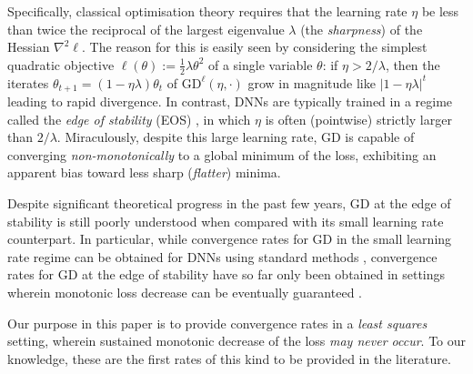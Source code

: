 \documentclass{article}
\newcommand{\GD}{\mathrm{GD}}
\theoremstyle{plain}
\theoremstyle{definition}
\theoremstyle{remark}
\begin{document}
Specifically, classical optimisation theory requires that the learning rate $\eta$ be less than twice the reciprocal of the largest eigenvalue $\lambda$ (the \emph{sharpness}) of the Hessian $\nabla^2\ell$. The reason for this is easily seen by considering the simplest quadratic objective $\ell(\theta):=\frac{1}{2}\lambda\theta^2$ of a single variable $\theta$: if $\eta>2/\lambda$, then the iterates $\theta_{t+1} = (1-\eta\lambda)\theta_t$ of $\GD^{\ell}(\eta,\cdot)$ grow in magnitude like $|1-\eta\lambda|^t$ leading to rapid divergence. In contrast, DNNs are typically trained in a regime called the \emph{edge of stability} (EOS) \cite{coheneos}, in which $\eta$ is often (pointwise) strictly larger than $2/\lambda$. Miraculously, despite this large learning rate, GD is capable of converging \emph{non-monotonically} to a global minimum of the loss, exhibiting an apparent bias toward less sharp (\emph{flatter}) minima.

Despite significant theoretical progress in the past few years, GD at the edge of stability is still poorly understood when compared with its small learning rate counterpart. In particular, while convergence rates for GD in the small learning rate regime can be obtained for DNNs using standard methods \cite{pl}, convergence rates for GD at the edge of stability have so far only been obtained in settings wherein monotonic loss decrease can be eventually guaranteed \cite{wu2023eos, wu2024eos, cai2024eos, liueos}. 

Our purpose in this paper is to provide convergence rates in a \emph{least squares} setting, wherein sustained monotonic decrease of the loss \emph{may never occur}. To our knowledge, these are the first rates of this kind to be provided in the literature.
\end{document}
